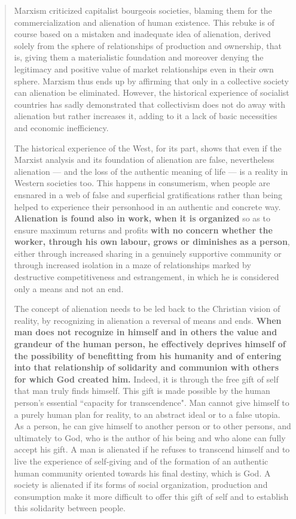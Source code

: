 \documentclass[letterpaper]{article}
\begin{document}
\begin{quote}
  Marxism criticized capitalist bourgeois societies, blaming them for the commercialization and alienation of human existence. This rebuke is of course based on a mistaken and inadequate idea of alienation, derived solely from the sphere of relationships of production and ownership, that is, giving them a materialistic foundation and moreover denying the legitimacy and positive value of market relationships even in their own sphere. Marxism thus ends up by affirming that only in a collective society can alienation be eliminated. However, the historical experience of socialist countries has sadly demonstrated that collectivism does not do away with alienation but rather increases it, adding to it a lack of basic necessities and economic inefficiency.

  The historical experience of the West, for its part, shows that even if the Marxist analysis and its foundation of alienation are false, nevertheless alienation — and the loss of the authentic meaning of life — is a reality in Western societies too. This happens in consumerism, when people are ensnared in a web of false and superficial gratifications rather than being helped to experience their personhood in an authentic and concrete way. \textbf{Alienation is found also in work, when it is organized} so as to ensure maximum returns and profits \textbf{with no concern whether the worker, through his own labour, grows or diminishes as a person}, either through increased sharing in a genuinely supportive community or through increased isolation in a maze of relationships marked by destructive competitiveness and estrangement, in which he is considered only a means and not an end.

  The concept of alienation needs to be led back to the Christian vision of reality, by recognizing in alienation a reversal of means and ends. \textbf{When man does not recognize in himself and in others the value and grandeur of the human person, he effectively deprives himself of the possibility of benefitting from his humanity and of entering into that relationship of solidarity and communion with others for which God created him.} Indeed, it is through the free gift of self that man truly finds himself. This gift is made possible by the human person's essential ``capacity for transcendence". Man cannot give himself to a purely human plan for reality, to an abstract ideal or to a false utopia. As a person, he can give himself to another person or to other persons, and ultimately to God, who is the author of his being and who alone can fully accept his gift. A man is alienated if he refuses to transcend himself and to live the experience of self-giving and of the formation of an authentic human community oriented towards his final destiny, which is God. A society is alienated if its forms of social organization, production and consumption make it more difficult to offer this gift of self and to establish this solidarity between people.
\end{quote}
\end{document}
